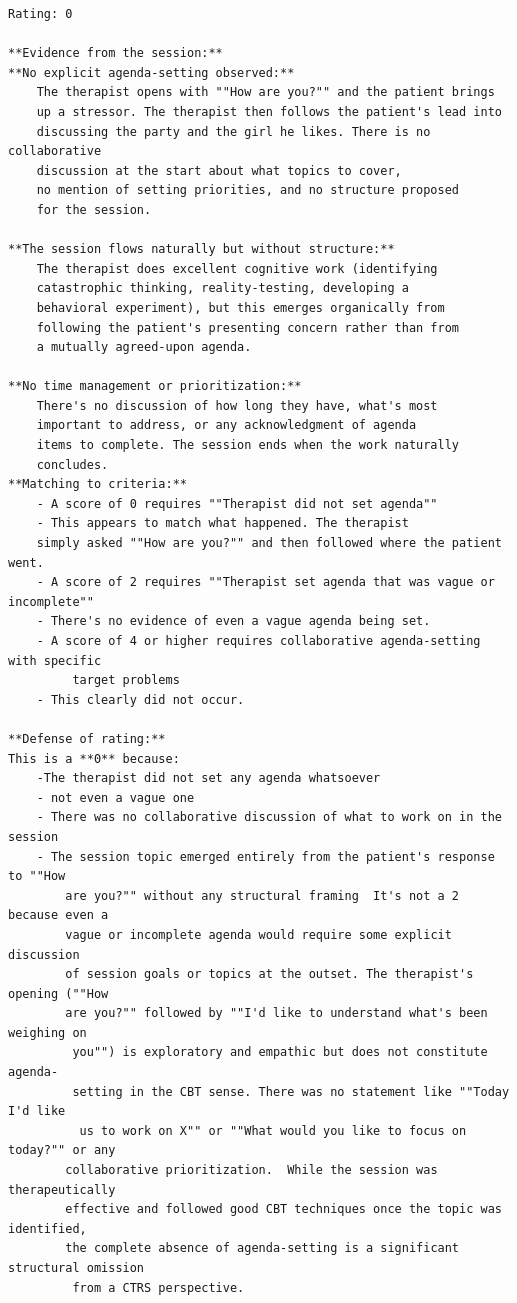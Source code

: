 \documentclass[twoside]{report}
\begin{document}
\begin{verbatim}
Rating: 0

**Evidence from the session:**  
**No explicit agenda-setting observed:** 
	The therapist opens with ""How are you?"" and the patient brings 
	up a stressor. The therapist then follows the patient's lead into 
	discussing the party and the girl he likes. There is no collaborative 
	discussion at the start about what topics to cover,
 	no mention of setting priorities, and no structure proposed 
 	for the session.  
	
**The session flows naturally but without structure:**
	The therapist does excellent cognitive work (identifying 
  	catastrophic thinking, reality-testing, developing a
   	behavioral experiment), but this emerges organically from 
	following the patient's presenting concern rather than from 
	a mutually agreed-upon agenda.  

**No time management or prioritization:** 
	There's no discussion of how long they have, what's most
	important to address, or any acknowledgment of agenda 
	items to complete. The session ends when the work naturally 
	concludes.  
**Matching to criteria:**  
	- A score of 0 requires ""Therapist did not set agenda"" 
	- This appears to match what happened. The therapist
	simply asked ""How are you?"" and then followed where the patient went. 
	- A score of 2 requires ""Therapist set agenda that was vague or incomplete""
	- There's no evidence of even a vague agenda being set. 
	- A score of 4 or higher requires collaborative agenda-setting with specific
		 target problems 
	- This clearly did not occur.  

**Defense of rating:**  
This is a **0** because: 
	-The therapist did not set any agenda whatsoever 
	- not even a vague one 
	- There was no collaborative discussion of what to work on in the session
	- The session topic emerged entirely from the patient's response to ""How 
		are you?"" without any structural framing  It's not a 2 because even a 
		vague or incomplete agenda would require some explicit discussion
		of session goals or topics at the outset. The therapist's opening (""How 
		are you?"" followed by ""I'd like to understand what's been weighing on
		 you"") is exploratory and empathic but does not constitute agenda-
		 setting in the CBT sense. There was no statement like ""Today I'd like
		  us to work on X"" or ""What would you like to focus on today?"" or any 
		collaborative prioritization.  While the session was therapeutically
		effective and followed good CBT techniques once the topic was identified, 
		the complete absence of agenda-setting is a significant structural omission
		 from a CTRS perspective.
\end{verbatim}
\end{document}
